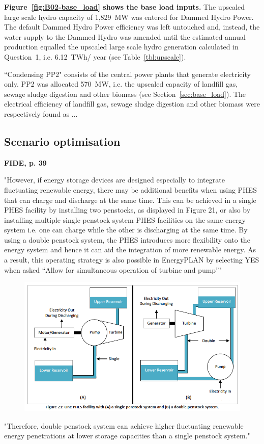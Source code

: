 \textbf{Figure~\ref{fig:B02-base_load} shows the base load inputs.}
The upscaled large scale hydro capacity of 1,829~MW was entered for Dammed Hydro Power.
The default Dammed Hydro Power efficiency was left untouched and, instead, the water supply to the Dammed Hydro was amended until the estimated annual production equalled the upscaled large scale hydro generation calculated in Question~1, i.e. 6.12~TWh/ year (see Table~\ref{tbl:upscale}).

``Condensing PP2" consists of the central power plants that generate electricity only.
PP2 was allocated 570~MW, i.e. the upscaled capacity of landfill gas, sewage sludge digestion and other biomass (see Section~\ref{sec:base_load}).
The electrical efficiency of landfill gas, sewage sludge digestion and other biomass were respectively found as ...


















\subsection{Scenario optimisation}


\newpage
\textbf{FIDE, p. 39}

"However, if energy storage devices are
designed especially to integrate fluctuating renewable energy, there may be additional benefits when using
PHES that can charge and discharge at the same time. This can be achieved in a single PHES facility by installing
two penstocks, as displayed in Figure 21, or also by installing multiple single penstock system PHES facilities on
the same energy system i.e. one can charge while the other is discharging at the same time. By using a double
penstock system, the PHES introduces more flexibility onto the energy system and hence it can aid the
integration of more renewable energy. As a result, this operating strategy is also possible in EnergyPLAN by
selecting YES when asked “Allow for simultaneous operation of turbine and pump”"

\begin{figure}[htbp]
	\centering
	\includegraphics[width=\textwidth]{figures/Simultaneous_charge_discharge.png}
\end{figure}

"Therefore, double penstock system can achieve higher fluctuating renewable energy
penetrations at lower storage capacities than a single penstock system."